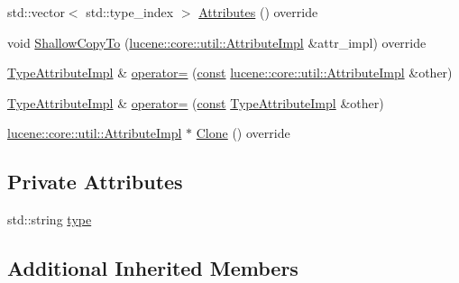 \begin{DoxyCompactItemize}
\item 
std\+::vector$<$ std\+::type\+\_\+index $>$ \mbox{\hyperlink{classlucene_1_1core_1_1analysis_1_1tokenattributes_1_1TypeAttributeImpl_ae7ba4a6e94fb4f1d1c8111e613793d59}{Attributes}} () override
\item 
void \mbox{\hyperlink{classlucene_1_1core_1_1analysis_1_1tokenattributes_1_1TypeAttributeImpl_a2eefa7e33a6e060c5493711cd60c9d2e}{Shallow\+Copy\+To}} (\mbox{\hyperlink{classlucene_1_1core_1_1util_1_1AttributeImpl}{lucene\+::core\+::util\+::\+Attribute\+Impl}} \&attr\+\_\+impl) override
\item 
\mbox{\hyperlink{classlucene_1_1core_1_1analysis_1_1tokenattributes_1_1TypeAttributeImpl}{Type\+Attribute\+Impl}} \& \mbox{\hyperlink{classlucene_1_1core_1_1analysis_1_1tokenattributes_1_1TypeAttributeImpl_a873153f88f6ec5485c4a0bed1374bb9b}{operator=}} (\mbox{\hyperlink{ZlibCrc32_8h_a2c212835823e3c54a8ab6d95c652660e}{const}} \mbox{\hyperlink{classlucene_1_1core_1_1util_1_1AttributeImpl}{lucene\+::core\+::util\+::\+Attribute\+Impl}} \&other)
\item 
\mbox{\hyperlink{classlucene_1_1core_1_1analysis_1_1tokenattributes_1_1TypeAttributeImpl}{Type\+Attribute\+Impl}} \& \mbox{\hyperlink{classlucene_1_1core_1_1analysis_1_1tokenattributes_1_1TypeAttributeImpl_ac7ab1e84d8128fd82a86629c321f558b}{operator=}} (\mbox{\hyperlink{ZlibCrc32_8h_a2c212835823e3c54a8ab6d95c652660e}{const}} \mbox{\hyperlink{classlucene_1_1core_1_1analysis_1_1tokenattributes_1_1TypeAttributeImpl}{Type\+Attribute\+Impl}} \&other)
\item 
\mbox{\hyperlink{classlucene_1_1core_1_1util_1_1AttributeImpl}{lucene\+::core\+::util\+::\+Attribute\+Impl}} $\ast$ \mbox{\hyperlink{classlucene_1_1core_1_1analysis_1_1tokenattributes_1_1TypeAttributeImpl_a3549b01075ae899b2e6dcfa7aa101eca}{Clone}} () override
\end{DoxyCompactItemize}
\subsection*{Private Attributes}
\begin{DoxyCompactItemize}
\item 
std\+::string \mbox{\hyperlink{classlucene_1_1core_1_1analysis_1_1tokenattributes_1_1TypeAttributeImpl_ad5781cf6585610066317c74d5d4a4f1c}{type}}
\end{DoxyCompactItemize}
\subsection*{Additional Inherited Members}


